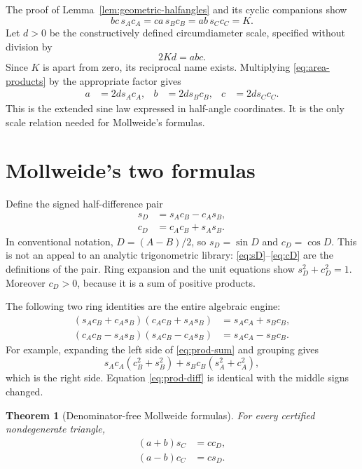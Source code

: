 \documentclass[11pt,letterpaper]{article}
\newtheorem{theorem}{Theorem}[section]
\theoremstyle{definition}
\theoremstyle{remark}
\begin{document}
The proof of Lemma~\ref{lem:geometric-halfangles} and its cyclic companions
show
\[
 bc\,s_Ac_A=ca\,s_Bc_B=ab\,s_Cc_C=K.
 \tag{3.10}\label{eq:area-products}
\]
Let \(d>0\) be the constructively defined circumdiameter scale, specified
without division by
\[
 2Kd=abc.
 \tag{3.11}\label{eq:d-scale}
\]
Since \(K\) is apart from zero, its reciprocal name exists.  Multiplying
\eqref{eq:area-products} by the appropriate factor gives
\begin{align}
 a&=2d s_Ac_A,
 &b&=2d s_Bc_B,
 &c&=2d s_Cc_C.
 \tag{3.12}\label{eq:side-halfangle}
\end{align}
This is the extended sine law expressed in half-angle coordinates.  It is the
only scale relation needed for Mollweide's formulas.

\section{Mollweide's two formulas}
\label{sec:mollweide}

Define the signed half-difference pair
\begin{align}
 s_D&=s_Ac_B-c_As_B,
 \tag{4.1a}\label{eq:sD}\\
 c_D&=c_Ac_B+s_As_B.
 \tag{4.1b}\label{eq:cD}
\end{align}
In conventional notation, \(D=(A-B)/2\), so \(s_D=\sin D\) and
\(c_D=\cos D\).  This is not an appeal to an analytic trigonometric library:
\eqref{eq:sD}--\eqref{eq:cD} are the definitions of the pair.  Ring expansion
and the unit equations show \(s_D^2+c_D^2=1\).  Moreover \(c_D>0\), because it
is a sum of positive products.

The following two ring identities are the entire algebraic engine:
\begin{align}
 (s_Ac_B+c_As_B)(c_Ac_B+s_As_B)
 &=s_Ac_A+s_Bc_B,
 \tag{4.2}\label{eq:prod-sum}\\
 (c_Ac_B-s_As_B)(s_Ac_B-c_As_B)
 &=s_Ac_A-s_Bc_B.
 \tag{4.3}\label{eq:prod-diff}
\end{align}
For example, expanding the left side of \eqref{eq:prod-sum} and grouping gives
\[
 s_Ac_A(c_B^2+s_B^2)+s_Bc_B(s_A^2+c_A^2),
\]
which is the right side.  Equation \eqref{eq:prod-diff} is identical with the
middle signs changed.

\begin{theorem}[Denominator-free Mollweide formulas]
\label{thm:mollweide-cross}
For every certified nondegenerate triangle,
\begin{align}
 (a+b)s_C&=c c_D,
 \tag{4.4}\label{eq:moll-sum-cross}\\
 (a-b)c_C&=c s_D.
 \tag{4.5}\label{eq:moll-diff-cross}
\end{align}
\end{theorem}
\end{document}
